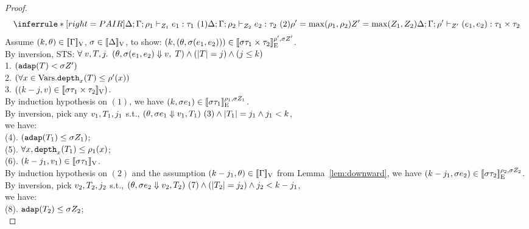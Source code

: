 \documentclass[a4paper,11pt]{article}
\theoremstyle{definition}
\begin{document}
\begin{proof}

\[
   \inferrule*[right = PAIR]{
      \Delta;\Gamma; \dmap_1 \tvdash{\nnatA_1} \expr_1: \type_1 ~ (1) 
   		\\
      \Delta;\Gamma; \dmap_2 \tvdash{\nnatA_2} \expr_2: \type_2 ~ (2)
      	\\\\
      \dmap' = \max(\dmap_1,\dmap_2) 
      	\\
      \nnatA' = \max(\nnatA_1,\nnatA_2)
    }{
      \Delta;\Gamma; \dmap' \tvdash{\nnatA'} (\expr_1, \expr_2): \type_1 \times \type_2
    }
\]
Assume $(\stepiA, \env) \in \lrv{\Gamma}$, $ \ienv \in \lrv{\Delta}$, 
to show: $(\stepiA, (\env, \ienv (\expr_1, \expr_2))) \in \lre{\dmap'}{\ienv \nnatA'}{\ienv \type_1 \times \type_2}$.\\
%
By inversion, STS: $\forall \eapp  \valr, \tr, j.$ 
$(\env, \ienv (\expr_1, \expr_2) \bigstep \valr, \eapp  \tr) \land (\size{\tr} = j) \land (j \leq \stepiA)$\\
%
1. $ (\adap(\tr) < \ienv \nnatA')$\\
2. $ (\forall x \in \mbox{Vars}. \ddep{x}(\tr) \leq \dmap'(x)) $\\
3. $ ((\stepiA - j, \valr) \in \lrv{\ienv \type_1 \times \type_2})$.\\
%
By induction hypothesis on $(1)$, we have $(\stepiA, \ienv \expr_1) \in \lre{\dmap_1}{\ienv \nnatA_1}{\ienv  \type_1}$.\\
%
By inversion, pick any $\valr_1,  \tr_1, j_1$ s.t.,
$(\env, \ienv \expr_1 \bigstep \valr_1, \tr_1) ~ (3) 
\land \size{\tr_1} = j_1
\land j_1 < \stepiA $,\\
%
we have: \\
(4). $(\adap(\tr_1) \leq \ienv  \nnatA_1)$;\\
% 
(5). $\forall x, \ddep{x}(\tr_1) \leq \dmap_1(x)$;\\
% 
(6). $ (\stepiA - j_1, \valr_1) \in \lrv{\ienv  \type_1} $.\\
%
By induction hypothesis on $(2)$ and the assumption $(\stepiA - j_1,
\env) \in \lrv{\Gamma}$ from Lemma~\ref{lem:downward}, we have $(\stepiA - j_1, \ienv  \expr_2) \in \lre{\dmap_2}{\ienv  \nnatA_2}{\ienv  \type_2}$.\\
%
By inversion, pick $\valr_2, \tr_2, j_2 $ s.t., $ (\env, \ienv \expr_2 \bigstep \valr_2, \tr_2) ~ (7) \land (\size{\tr_2} = j_2) \land j_2 < \stepiA-j_1 $,\\
%
we have:\\
(8). $\adap(\tr_2) \leq \ienv  \nnatA_2$;\\

\end{proof}
\end{document}
